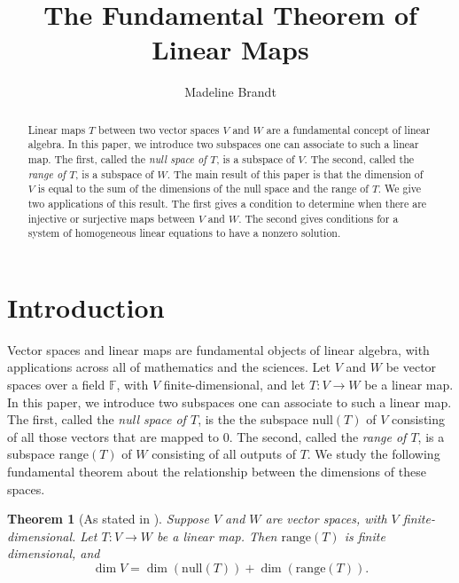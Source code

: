 \documentclass[11pt,reqno]{amsart}
\title{The Fundamental Theorem of Linear Maps}
\author[M. Brandt]{Madeline Brandt}
\newtheorem{maintheorem}{Theorem}
\theoremstyle{definition}
\newcommand{\F}{\mathbb{F}}
\newcommand{\nul}{\mathrm{null}}
\newcommand{\range}{\mathrm{range}}
\begin{document}
\maketitle
\setcounter{tocdepth}{1}

\begin{abstract}
   Linear maps $T$ between two vector spaces $V$ and $W$ are a fundamental concept of linear algebra. In this paper, we introduce two subspaces one can associate to such a linear map. The first, called the \emph{null space of $T$}, is a subspace of $V$. The second, called the \emph{range of $T$}, is a subspace of $W$. The main result of this paper is that the dimension of $V$ is equal to the sum of the dimensions of the null space and the range of $T$. We give two applications of this result. The first gives a condition to determine when there are injective or surjective maps between $V$ and $W$. The second gives conditions for a system of homogeneous linear equations to have a nonzero solution.
\end{abstract}

\section{Introduction}

Vector spaces and linear maps are fundamental objects of linear algebra, with applications across all of mathematics and the sciences. Let $V$ and $W$ be vector spaces over a field $\F$, with $V$ finite-dimensional, and let $T:V\rightarrow W$ be a linear map. In this paper, we introduce two subspaces one can associate to such a linear map. The first, called the \emph{null space of $T$}, is the the subspace $\nul(T)$ of $V$ consisting of all those vectors that are mapped to 0. 
The second, called the \emph{range of $T$}, is a subspace $\range(T)$ of $W$ consisting of all outputs of $T$. We study the following fundamental theorem about the relationship between the dimensions of these spaces.

\begin{maintheorem}[As stated in \cite{axler}]
\label{thm:main}
Suppose $V$ and $W$ are vector spaces, with $V$ finite-dimensional. Let $T: V \rightarrow W$ be a linear map. Then $\range(T)$ is finite dimensional, and 
$$
\dim V = \dim (\nul (T)) + \dim (\range (T)).
$$
\end{maintheorem}
\end{document}
